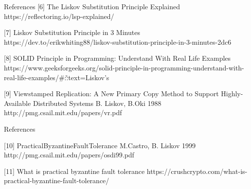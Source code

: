 \documentclass{beamer}
\begin{document}
\begin{frame}{References}
\vspace{1mm}
[6] {The Liskov Substitution Principle Explained} https://reflectoring.io/lsp-explained/
\newline

[7] {Liskov Substitution Principle in 3 Minutes}
https://dev.to/erikwhiting88/liskov-substitution-principle-in-3-minutes-2dc6
\newline

[8] {SOLID Principle in Programming: Understand With Real Life Examples}
https://www.geeksforgeeks.org/solid-principle-in-programming-understand-with-real-life-examples/\#:\~:text=Liskov's%
\newline

[9] {Viewstamped Replication: A New Primary Copy Method to Support Highly-Available Distributed Systems B. Liskov, B.Oki 1988}
http://pmg.csail.mit.edu/papers/vr.pdf
\newline

\end{frame}


\begin{frame}{References}

[10] {PracticalByzantineFaultTolerance M.Castro, B. Liskov 1999} http://pmg.csail.mit.edu/papers/osdi99.pdf
\newline


[11] What is practical byzantine fault tolerance
https://crushcrypto.com/what-is-practical-byzantine-fault-tolerance/


\end{frame}



\end{document}
